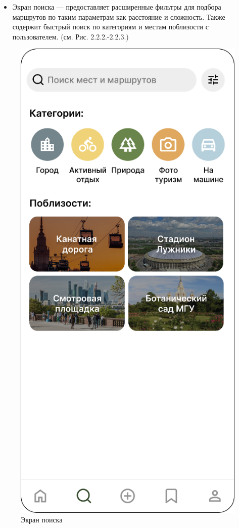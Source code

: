\begin{itemize}
    \item Экран поиска — предоставляет расширенные фильтры для подбора маршрутов по таким параметрам как расстояние и сложность. Также содержит быстрый поиск по категориям и местам поблизости с пользователем. (см. Рис. 2.2.2.-2.2.3.)
\end{itemize}
\begin{figure}[H]
        \centering
        \includegraphics[width=0.4\linewidth]{Images/ui/Picture2.png}
        \caption{Экран поиска}
        \label{fig:ui_screen_2}
\end{figure}

